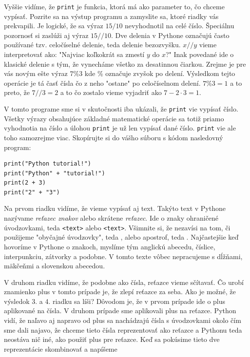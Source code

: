 \documentclass{article}
\begin{document}
Vyššie vidíme, že \texttt{print} je funkcia, ktorá má ako parameter to, čo chceme vypísať. Pozrite sa na výstup programu a zamyslite sa, ktoré riadky vás prekvapili. Je logické, že sa výraz $15 / 10$ nevyhodnotil na celé číslo. Špeciálnu pozornosť si zaslúži aj výraz $15 // 10$. Dve delenia v Pythone označujú často používané tzv. celočíselné delenie, teda delenie bezozvyšku. $x // y$ vieme interpretovať ako: "Najviac koľkokrát sa zmestí $y$ do $x$?" Inak povedané ide o klasické delenie s tým, že vynecháme všetko za desatinnou čiarkou.
Zrejme je pre vás novým ešte výraz $7 \% 3$ kde \% označuje zvyšok po delení. Výsledkom tejto operácie je tá časť čísla čo z neho "ostane" po celočíselnom delení. $7\%3=1$ a to preto, že $7//3=2$ a to čo zostalo vieme vyjadriť ako $7 - 2 \cdot 3 = 1$.

V tomto programe sme si v skutočnosti iba ukázali, že \texttt{print} vie vypísať číslo. Všetky výrazy obsahujúce základné matematické operácie sa totiž priamo vyhodnotia na číslo a úlohou \texttt{print} je už len vypísať dané číslo. \texttt{print} vie ale toho samozrejme viac. Skopírujte si do vášho súboru s kódom nasledovný program:

\begin{lstlisting}
print("Python tutorial!")
print("Python" + "tutorial!")
print(2 + 3)
print("2" + "3")
\end{lstlisting}

Na prvom riadku vidíme, že vieme vypísať aj text. Takýto text v Pythone nazývame \textit{reťazec znakov} alebo skrátene \textit{reťazec}. Ide o znaky ohraničené úvodzovkami, teda \texttt{\textquotedbl<text>\textquotedbl} alebo \texttt{\textquotesingle<text>\textquotesingle}. Všimnite si, že nezavísi na tom, či použijeme "obyčajné úvodzovky", teda \texttt{\textquotedbl}, alebo apostrof, teda \textquotesingle. Najčastejšie keď hovoríme v Pythone o znakoch, myslíme tým anglickú abecedu, číslice, interpunkciu, zátvorky a podobne. V tomto texte vôbec nepracujeme s dĺžňami, mäkčeňmi a slovenskou abecedou.

V druhom riadku vidíme, že podobne ako čísla, reťazce vieme sčítavať. Čo urobí znamienko plus v tomto prípade je, že zlepí reťazce za seba. Ako je možné, že výsledok 3. a 4. riadku sa líši? Dôvodom je, že v prvom prípade ide o plus aplikované na čísla. V druhom prípade sme aplikovali plus na reťazce. Python vidí, že naľavo aj napravo od plus sa nachádzajú čísla s úvodzovkami okolo čím sme dali najavo, že chceme tieto čísla reprezentovať ako reťazce a Pythonu teda neostáva nič iné, ako použiť plus pre reťazce.
Keď sa pokúsime tieto dve reprezentácie skombinovať a 
napíšeme
\end{document}
